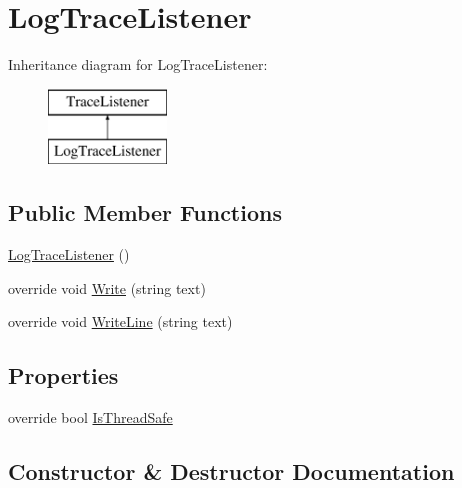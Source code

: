 \hypertarget{classOTA_1_1Logging_1_1LogTraceListener}{}\section{Log\+Trace\+Listener}
\label{classOTA_1_1Logging_1_1LogTraceListener}
Inheritance diagram for Log\+Trace\+Listener\+:\begin{figure}[H]
\begin{center}
\leavevmode
\includegraphics[height=2.000000cm]{classOTA_1_1Logging_1_1LogTraceListener}
\end{center}
\end{figure}
\subsection*{Public Member Functions}
\begin{DoxyCompactItemize}
\item 
\hyperlink{classOTA_1_1Logging_1_1LogTraceListener_aa08c3e75a28279e07ad502809225769f}{Log\+Trace\+Listener} ()
\item 
override void \hyperlink{classOTA_1_1Logging_1_1LogTraceListener_af5465d3000aefc62f559dac9405a44c1}{Write} (string text)
\item 
override void \hyperlink{classOTA_1_1Logging_1_1LogTraceListener_a9740141f8fec031278846d10d9e6abf5}{Write\+Line} (string text)
\end{DoxyCompactItemize}
\subsection*{Properties}
\begin{DoxyCompactItemize}
\item 
override bool \hyperlink{classOTA_1_1Logging_1_1LogTraceListener_a59b7f364aa56891e8d1c197ef983b687}{Is\+Thread\+Safe}
\end{DoxyCompactItemize}


\subsection{Constructor \& Destructor Documentation}
\hypertarget{classOTA_1_1Logging_1_1LogTraceListener_aa08c3e75a28279e07ad502809225769f}{}
